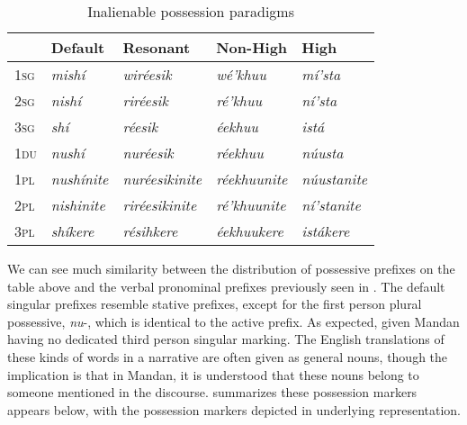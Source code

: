 \begin{table}
\caption{Inalienable possession paradigms}\label{TableInalienable}
\begin{tabular}{lllll}
\lsptoprule
~&          \textbf{Default}&        \textbf{Resonant}&
   \textbf{Non-High}& \textbf{High}\\
\midrule
\textsc{1sg}&   \textit{mishí} & \textit{wiréesik}&
    \textit{wé'khuu}&   \textit{mí'sta}\\
\textsc{2sg}&   \textit{nishí} & \textit{riréesik}&
    \textit{ré'khuu}&   \textit{ní'sta}\\
\textsc{3sg}&   \textit{shí} & \textit{réesik}&
    \textit{éekhuu}&  \textit{istá}\\
\textsc{1du}&   \textit{nushí} & \textit{nuréesik}&
    \textit{réekhuu}&  \textit{núusta}\\
\textsc{1pl}&   \textit{nushínite} & \textit{nuréesikinite}&
    \textit{réekhuunite}&  \textit{núustanite}\\
\textsc{2pl}&   \textit{nishinite}&  \textit{riréesikinite}&
    \textit{ré'khuunite}&  \textit{ní'stanite}\\
\textsc{3pl}&   \textit{shíkere}& \textit{résihkere}&
    \textit{éekhuukere}&  \textit{istákere}\\
\hline\hline
\end{tabular}
\end{table}

We can see much similarity between the distribution of possessive prefixes on the table above and the verbal pronominal prefixes previously seen in . The default singular prefixes resemble stative prefixes, except for the first person plural possessive, \textit{nu}-, which is identical to the active prefix. As expected, given Mandan having no dedicated third person singular marking. The English translations of these kinds of words in a narrative are often given as general nouns, though the implication is that in Mandan, it is understood that these nouns belong to someone mentioned in the discourse.   summarizes these possession markers appears below, with the possession markers depicted in underlying representation.


